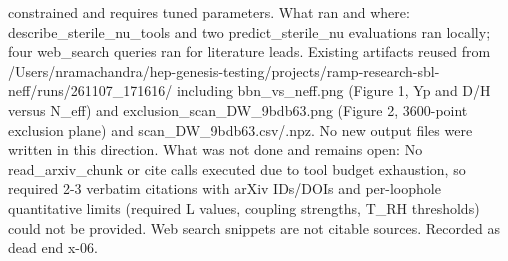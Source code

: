 \documentclass[11pt,a4paper]{article}
\begin{document}
constrained and requires tuned parameters. What ran and where: describe\_sterile\_nu\_tools and two predict\_sterile\_nu evaluations ran locally; four web\_search queries ran for literature leads. Existing artifacts reused from /Users/nramachandra/hep-genesis-testing/projects/ramp-research-sbl-neff/runs/261107\_171616/ including bbn\_vs\_neff.png (Figure 1, Yp and D/H versus N\_eff) and exclusion\_scan\_DW\_9bdb63.png (Figure 2, 3600-point exclusion plane) and scan\_DW\_9bdb63.csv/.npz. No new output files were written in this direction. What was not done and remains open: No read\_arxiv\_chunk or cite calls executed due to tool budget exhaustion, so required 2-3 verbatim citations with arXiv IDs/DOIs and per-loophole quantitative limits (required L values, coupling strengths, T\_RH thresholds) could not be provided. Web search snippets are not citable sources. Recorded as dead end x-06.
\end{document}
